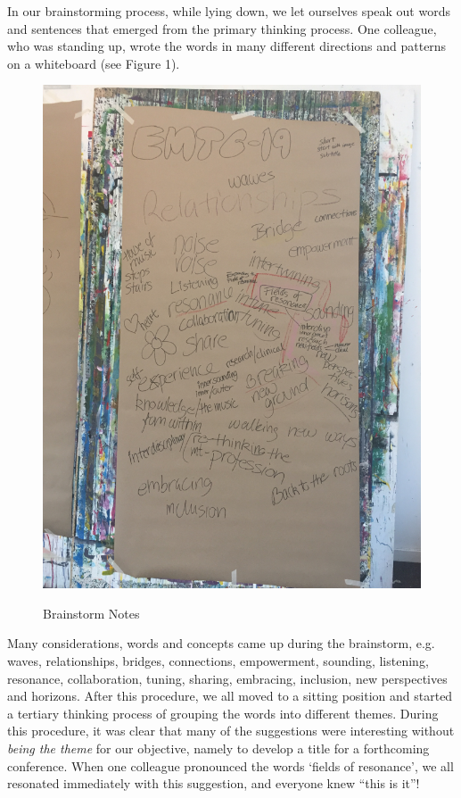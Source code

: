 \begin{adjmulticols}{2}{0mm}{0mm}
In our brainstorming process, while lying down, we let ourselves speak out words and sentences that emerged from the primary thinking process. One  colleague, who was standing up, wrote the words in many different directions and patterns on a whiteboard (see Figure 1).
\FloatBarrier
\noindent
\begin{figure}[H]
\centering %
\caption{Brainstorm Notes} %
\includegraphics[width=0.9\linewidth]{paper2/p2_data/p2-fig1.png}
\label{fig:p2:1}
\end{figure}
\FloatBarrier
Many considerations, words and concepts came up during the brainstorm, e.g. waves, relationships, bridges, connections, empowerment, sounding, listening, resonance, collaboration, tuning, sharing, embracing, inclusion, new perspectives and horizons. After this procedure, we all moved to a sitting position and started a tertiary thinking process of grouping the words into different themes. During this procedure, it was clear that many of the suggestions were interesting without \textit{being the theme} for our objective, namely to develop a title for a forthcoming conference. When one colleague pronounced the words ‘fields of resonance’, we all resonated immediately with this suggestion, and everyone knew \enquote{this is it}!


\end{adjmulticols}
